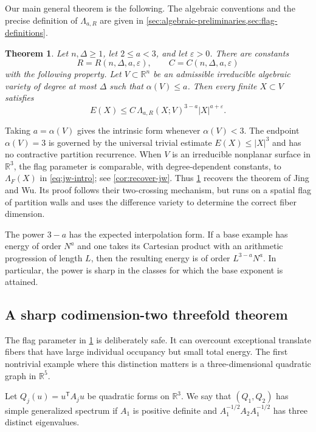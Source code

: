 \documentclass[11pt]{amsart}
\numberwithin{equation}{section}
\newtheorem{theorem}{Theorem}[section]
\theoremstyle{definition}
\theoremstyle{remark}
\newcommand{\R}{\mathbb R}
\newcommand{\eps}{\varepsilon}
\newcommand{\1}{\mathbf 1}
\newcommand{\card}[1]{\lvert #1\rvert}
\begin{document}
Our main general theorem is the following.  The algebraic conventions and the precise definition of $\Lambda_{a,R}$ are given in \cref{sec:algebraic-preliminaries,sec:flag-definitions}.

\begin{theorem}\label{thm:flagged-main}
Let $n,\Delta\geq1$, let $2\leq a<3$, and let $\eps>0$.  There are constants
\[
 R=R(n,\Delta,a,\eps),
 \qquad
 C=C(n,\Delta,a,\eps)
\]
with the following property.  Let $V\subset\R^n$ be an admissible irreducible algebraic variety of degree at most $\Delta$ such that $\alpha(V)\leq a$.  Then every finite $X\subset V$ satisfies
\begin{equation}\label{eq:flagged-main-intro}
 E(X)\leq C\,\Lambda_{a,R}(X;V)^{3-a}\card X^{a+\eps}.
\end{equation}
\end{theorem}

Taking $a=\alpha(V)$ gives the intrinsic form whenever $\alpha(V)<3$.  The endpoint $\alpha(V)=3$ is governed by the universal trivial estimate $E(X)\leq|X|^3$ and has no contractive partition recurrence.  When $V$ is an irreducible nonplanar surface in $\R^3$, the flag parameter is comparable, with degree-dependent constants, to $\Lambda_F(X)$ in \eqref{eq:jw-intro}; see \cref{cor:recover-jw}.  Thus \cref{thm:flagged-main} recovers the theorem of Jing and Wu.  Its proof follows their two-crossing mechanism, but runs on a spatial flag of partition walls and uses the difference variety to determine the correct fiber dimension.

The power $3-a$ has the expected interpolation form.  If a base example has energy of order $N^a$ and one takes its Cartesian product with an arithmetic progression of length $L$, then the resulting energy is of order $L^{3-a}N^a$.  In particular, the power is sharp in the classes for which the base exponent is attained.

\subsection{A sharp codimension-two threefold theorem}
The flag parameter in \cref{thm:flagged-main} is deliberately safe.  It can overcount exceptional translate fibers that have large individual occupancy but small total energy.  The first nontrivial example where this distinction matters is a three-dimensional quadratic graph in $\R^5$.

Let $Q_j(u)=u^{\mathsf T}A_ju$ be quadratic forms on $\R^3$.  We say that $(Q_1,Q_2)$ has simple generalized spectrum if $A_1$ is positive definite and $A_1^{-1/2}A_2A_1^{-1/2}$ has three distinct eigenvalues.
\end{document}
